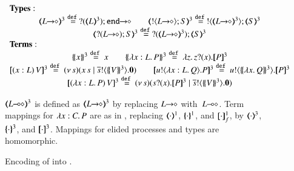 \begin{figure}[t]
$
{%
\begin{array}{c}
	\multicolumn{1}{l}{\noindent{\bf Types:}}
	\\
	\tmap{\shot{L}}{3} \defeq \shot{\btinp{\tmap{L}{3}} \tinact}
	\qquad
	\tmap{\btout{\shot{L}} S}{3} \defeq \btout{\tmap{\shot{L}}{3}} \tmap{S}{3}
	\\
	\tmap{\btinp{\shot{L}} S}{3} \defeq \btinp{\tmap{\shot{L}}{3}} \tmap{S}{3}
	\\
	\multicolumn{1}{l}{\noindent{\bf Terms:}}
	\\
	\auxmap{x}{3} \defeq x
	\qquad
	\auxmap{\abs{x: L}{P}}{3} \defeq \abs{z}{\binp{z}{x} \pmap{P}{3}}
	\\
	\pmap{\appl{(x:L)}{V}}{3} \defeq \newsp{s}{\appl{x}{s} \Par \bout{\dual{s}}{\auxmap{V}{3}} \inact}
	\qquad
	\pmap{\bout{u}{\abs{x: L}{Q}} P}{3} \defeq \bout{u}{\auxmap{\abs{x}{Q}}{3} } \pmap{P}{3}
	\\
	\pmap{\appl{(\abs{x: L}{P})}{V}}{3} \defeq \newsp{s}{\binp{s}{x} \pmap{P}{3} \Par  \bout{\dual{s}}{\auxmap{V}{3}} \inact}
\end{array}
}
$

$\tmap{\lhot{L}}{3}$ is defined as $\tmap{\shot{L}}{3}$
by replacing $L\!\! \rightarrow\!\! \diamond$ with~$L\!\! \multimap\!\! \diamond$.
Term mappings for $\lambda x:C.\,P$ are
as in , replacing 
$(\!\!\langle\cdot\rangle\!\!)^{1}$,
$\{\!\!\{\cdot\}\!\!\}^{1}$, and 
$[\!\![\cdot]\!\!]^1_f$, by  
$(\!\!\langle\cdot\rangle\!\!)^{3}$,
$\{\!\!\{\cdot\}\!\!\}^{3}$, and 
$[\!\![\cdot]\!\!]^3$.
Mappings for elided processes and types are homomorphic.

\caption{\label{f:enc:hopip_to_hopi} Encoding of \HOpp into \HOp.}
\end{figure} 

